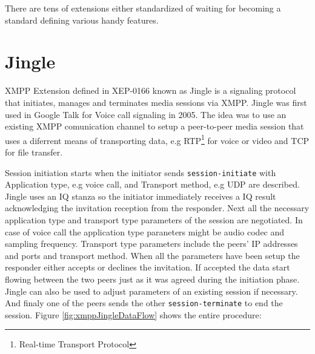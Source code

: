There are tens of extensions either standardized of waiting for becoming a standard defining various handy features.

\section{Jingle}
XMPP Extension defined in XEP-0166 \cite{xepJignle} known as Jingle is a signaling protocol that initiates, manages and terminates media sessions via XMPP. Jingle was first used in Google Talk \cite{googleTalk} for Voice call signaling in 2005. The idea was to use an existing XMPP comunication channel to setup a peer-to-peer media session that uses a diferrent means of transporting data, e.g RTP\footnote{Real-time Transport Protocol} for voice or video and TCP for file transfer. 

Session initiation starts when the initiator sends \verb|session-initiate| with Application type, e.g voice call, and Transport method, e.g UDP are described. Jingle uses an IQ stanza so the initiator immediately receives a IQ result acknowledging the invitation reception from the responder. Next all the necessary application type and transport type parameters of the session are negotiated. In case of voice call the application type paraneters might be audio codec and sampling frequency. Transport type parameters include the peers' IP addresses and ports and transport method. When all the parameters have been setup the responder either accepts or declines the invitation. If accepted the data start flowing between the two peers just as it was agreed during the initiation phase. Jingle can also be used to adjust parameters of an existing session if necessary. And finaly one of the peers sends the other \verb|session-terminate| to end the session. Figure \ref{fig:xmppJingleDataFlow} shows the entire procedure:

